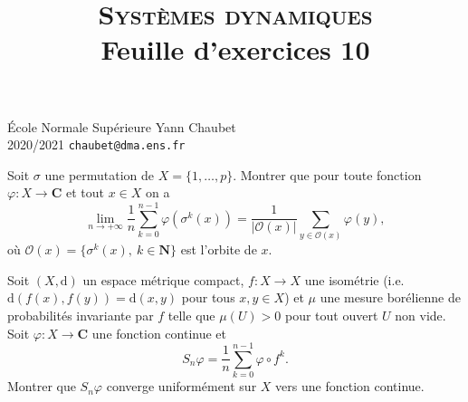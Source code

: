 \documentclass[a4paper,10pt,openany]{article}
\title{\textsc{Syst\`emes dynamiques} \\  Feuille d'exercices 10}
\date{}
\author{}
\theoremstyle{plain}
\theoremstyle{definition}
\newcommand{\dd}{\mathrm{d}}
\newcommand{\N}{\mathbf{N}}
\newcommand{\C}{\mathbf{C}}
\begin{document}
{\noindent \'Ecole Normale Sup\'erieure  \hfill Yann Chaubet } \\
{2020/2021 \hfill  \texttt{chaubet@dma.ens.fr}}

{\let\newpage\relax\maketitle}
\maketitle
 
 
\vspace{1cm}
 \vspace{1.5mm} 

\noindent Soit $\sigma$ une permutation de $X = \{1, \dots, p\}$. Montrer que pour toute fonction $\varphi : X \to \C$ et tout $x \in X$ on a
$$
\lim_{n \to +\infty} \frac{1}{n} \sum_{k=0}^{n-1} \varphi\left(\sigma^k(x)\right) = \frac{1}{\left|\mathcal{O}(x)\right|} \sum_{y \in \mathcal{O}(x)}  \varphi(y),
$$
o\`u $\mathcal{O}(x) = \{\sigma^k(x),~k \in \N\}$ est l'orbite de $x$.
\vspace{0.6cm}

 \vspace{1.5mm} 

\noindent Soit $(X, \dd)$ un espace m\'etrique compact, $f : X \to X$ une isom\'etrie (i.e. $\dd(f(x), f(y)) = \dd(x,y)$ pour tous $x,y \in X$) et $\mu$ une mesure bor\'elienne de probabilit\'es invariante par $f$ telle que $\mu(U) > 0$ pour tout ouvert $U$ non vide. Soit $\varphi : X \to \C$ une fonction continue et 
$$
S_n \varphi = \frac{1}{n}  \sum_{k=0}^{n-1} \varphi \circ f^k.
$$ 
Montrer que $S_n\varphi$
converge uniform\'ement sur $X$ vers une fonction continue.
\iffalse
\begin{enumerate}
\item Montrer que pour tout $\delta > 0$, il existe $J \in \N$ et $x_1, \dots, x_J \in X$ tels que $\displaystyle{X = \bigcup_{j = 1}^J B(x_j, \delta)}$ et pour tout $j = 1, \dots J$, la suite
$
S_n \varphi (x_j) 
$
converge quand $n \to +\infty$.
\item Montrer que $S_n\varphi$
converge uniform\'ement sur $X$ vers une fonction continue.
\end{enumerate}
\fi

\vspace{0.6cm}
\end{document}
